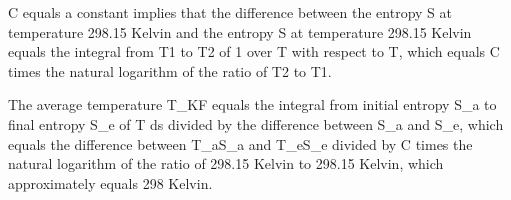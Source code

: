 C equals a constant implies that the difference between the entropy S at temperature 298.15 Kelvin and the entropy S at temperature 298.15 Kelvin equals the integral from T1 to T2 of 1 over T with respect to T, which equals C times the natural logarithm of the ratio of T2 to T1.

The average temperature T_KF equals the integral from initial entropy S_a to final entropy S_e of T ds divided by the difference between S_a and S_e, which equals the difference between T_aS_a and T_eS_e divided by C times the natural logarithm of the ratio of 298.15 Kelvin to 298.15 Kelvin, which approximately equals 298 Kelvin.